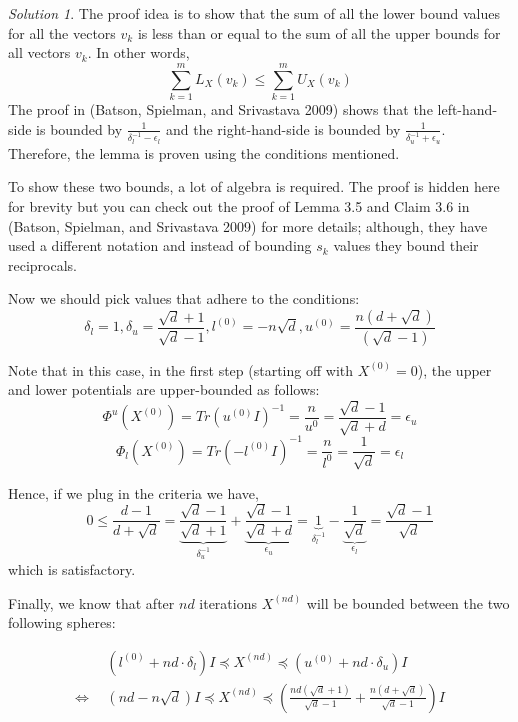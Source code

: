 \documentclass[
  letterpaper,
  DIV=11,
  numbers=noendperiod]{scrartcl}
\theoremstyle{plain}
\theoremstyle{plain}
\theoremstyle{plain}
\theoremstyle{definition}
\theoremstyle{plain}
\theoremstyle{remark}
\newtheorem*{solution}{Solution}
\begin{document}
\begin{solution}

The proof idea is to show that the sum of all the lower bound values for
all the vectors \(v_k\) is less than or equal to the sum of all the
upper bounds for all vectors \(v_k\). In other words,
\[\sum_{k=1}^m L_X(v_k) \le \sum_{k=1}^m U_X(v_k)\] The proof in
(Batson, Spielman, and Srivastava 2009) shows that the left-hand-side is
bounded by \(\frac{1}{\delta_l^{-1} - \epsilon_l}\) and the
right-hand-side is bounded by \(\frac{1}{\delta_u^{-1} + \epsilon_u}\).
Therefore, the lemma is proven using the conditions mentioned.

To show these two bounds, a lot of algebra is required. The proof is
hidden here for brevity but you can check out the proof of Lemma 3.5 and
Claim 3.6 in (Batson, Spielman, and Srivastava 2009) for more details;
although, they have used a different notation and instead of bounding
\(s_k\) values they bound their reciprocals.

\end{solution}

Now we should pick values that adhere to the conditions:
\[\delta_l = 1, \delta_u = \frac{\sqrt{d} + 1}{ \sqrt{d} - 1}, l^{(0)} = -n \sqrt{d}, u^{(0)} = \frac{n(d+\sqrt{d})}{(\sqrt{d} -1)}\]

Note that in this case, in the first step (starting off with
\(X^{(0)} = 0\)), the upper and lower potentials are upper-bounded as
follows:
\[\Phi^u(X^{(0)}) = Tr(u^{(0)}I)^{-1} = \frac{n}{u^{0}} = \frac{\sqrt{d} - 1}{\sqrt{d} + d} = \epsilon_u\]
\[\Phi_l(X^{(0)}) = Tr(-l^{(0)} I)^{-1} = \frac{n}{l^{0}} = \frac{1}{\sqrt{d}} = \epsilon_l\]

Hence, if we plug in the criteria we have, \[
0 \le 
\frac{d-1}{d + \sqrt{d}} = \underset{\delta_u^{-1}}{\underbrace{\frac{\sqrt{d} - 1}{\sqrt{d} + 1}}} + \underset{\epsilon_u}{\underbrace{\frac{\sqrt{d}-1}{\sqrt{d}+d}}} = \underset{\delta_l^{-1}}{\underbrace{1}} - \underset{\epsilon_l}{\underbrace{\frac{1}{\sqrt{d}}}} = \frac{\sqrt{d} - 1}{\sqrt{d}}
\] which is satisfactory.

Finally, we know that after \(nd\) iterations \(X^{(nd)}\) will be
bounded between the two following spheres:

\begin{align*}
&~~(l^{(0)} + nd \cdot \delta_l) I \preceq X^{(nd)} \preceq (u^{(0)} + nd \cdot \delta_u) I\\
\Leftrightarrow & ~~ (nd - n \sqrt{d}) I \preceq X^{(nd)} \preceq \left(\frac{nd (\sqrt{d} + 1)}{\sqrt{d} - 1} + \frac{n(d + \sqrt{d})}{\sqrt{d} - 1}\right) I
\end{align*}
\end{document}
